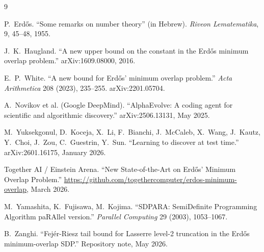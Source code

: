 \documentclass[11pt]{article}
\theoremstyle{plain}
\theoremstyle{definition}
\begin{document}

\begin{thebibliography}{9}

P.~Erd\H{o}s.
``Some remarks on number theory'' (in Hebrew).
\textit{Riveon Lematematika}, 9, 45–48, 1955.

J.~K.~Haugland.
``A new upper bound on the constant in the Erd\H{o}s minimum overlap problem.''
arXiv:1609.08000, 2016.

E.~P.~White.
``A new bound for Erd\H{o}s' minimum overlap problem.''
\textit{Acta Arithmetica} 208 (2023), 235--255. arXiv:2201.05704.

A.~Novikov et al. (Google DeepMind).
``AlphaEvolve: A coding agent for scientific and algorithmic discovery.''
arXiv:2506.13131, May 2025.

M.~Yuksekgonul, D.~Koceja, X.~Li, F.~Bianchi, J.~McCaleb, X.~Wang,
J.~Kautz, Y.~Choi, J.~Zou, C.~Guestrin, Y.~Sun.
``Learning to discover at test time.''
arXiv:2601.16175, January 2026.

Together AI / Einstein Arena.
``New State-of-the-Art on Erd\H{o}s' Minimum Overlap Problem.''
\url{https://github.com/togethercomputer/erdos-minimum-overlap}, March 2026.

M.~Yamashita, K.~Fujisawa, M.~Kojima.
``SDPARA: SemiDefinite Programming Algorithm paRAllel version.''
\textit{Parallel Computing} 29 (2003), 1053--1067.

B.~Zanghi.
``Fej\'er-Riesz tail bound for Lasserre level-2 truncation
in the Erd\H{o}s minimum-overlap SDP.''
Repository note, May 2026.

\end{thebibliography}
\end{document}
